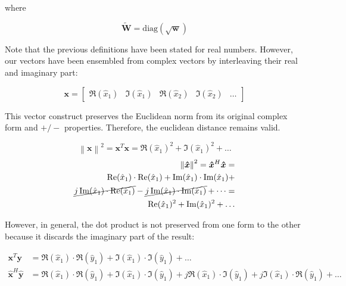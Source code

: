 \documentclass[../main.tex]{subfiles}
\begin{document}
where 

\begin{equation}
    \bm{\tilde{W}} = \text{diag}(\sqrt{\bm{w}})
\end{equation}

Note that the previous definitions have been stated for real numbers. However, our vectors have been ensembled from complex vectors by interleaving their real and imaginary part:

\begin{equation}
    \bm{x} = 
    \begin{bmatrix}
        \Re(\hat{x}_1) & \Im(\hat{x}_1) & \Re(\hat{x}_2) & \Im(\hat{x}_2) & \dots  
    \end{bmatrix}
\end{equation}

This vector construct preserves the Euclidean norm from its original complex form and $+/-$ properties. Therefore, the euclidean distance remains valid.

\begin{equation}
    \left\lVert \bm{x} \right\rVert^2 = \bm{x}^T\bm{x} = \Re(\hat{x}_1)^2 + \Im(\hat{x}_1)^2 + \dots
\end{equation}
\begin{equation}
\begin{split}
    \left\lVert \bm{\hat{x}} \right\rVert^2 = \bm{\hat{x}}^H\bm{\hat{x}} =\\
    \Re(\hat{x}_1) \cdot \Re(\hat{x}_1) + \Im(\hat{x}_1) \cdot \Im(\hat{x}_1) +\\
    \cancel{j\Im(\hat{x}_1) \cdot \Re(\hat{x}_1)} - \cancel{j\Im(\hat{x}_1) \cdot \Im(\hat{x}_1)} + \dots =\\ \Re(\hat{x}_1)^2 + \Im(\hat{x}_1)^2 + \dots
\end{split}
\end{equation}

However, in general, the dot product is not preserved from one form to the other because it discards the imaginary part of the result:

\begin{align}
    \bm{x}^T\bm{y} &= \Re(\hat{x}_1) \cdot \Re(\hat{y}_1) + \Im(\hat{x}_1) \cdot \Im(\hat{y}_1) + \dots\\
    \bm{\hat{x}}^H\bm{\hat{y}} &= \Re(\hat{x}_1) \cdot \Re(\hat{y}_1) + \Im(\hat{x}_1) \cdot \Im(\hat{y}_1) + j \Re(\hat{x}_1) \cdot \Im(\hat{y}_1) + j\Im(\hat{x}_1) \cdot \Re(\hat{y}_1) + \dots
\end{align}
\end{document}
